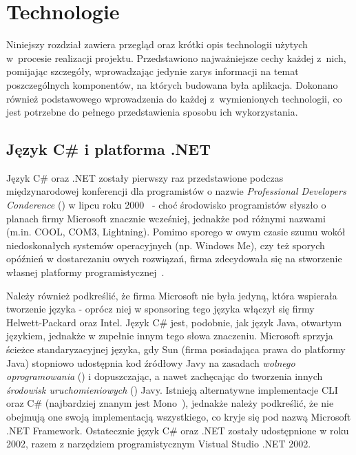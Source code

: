 \chapter{Technologie}\label{chap:technologie}

Niniejszy rozdział zawiera przegląd oraz krótki opis technologii użytych w~procesie realizacji projektu. Przedstawiono najważniejsze cechy każdej z~nich, pomijając szczegóły, wprowadzając jedynie zarys informacji na temat poszczególnych komponentów, na których budowana była aplikacja. Dokonano również podstawowego wprowadzenia do każdej z~wymienionych technologii, co jest potrzebne do pełnego przedstawienia sposobu ich wykorzystania.

\section{Język C\# i platforma .NET}\label{sec:cs}
Język C\# oraz .NET zostały pierwszy raz przedstawione podczas międzynarodowej konferencji dla programistów o nazwie \emph{Professional Developers Conderence} () w lipcu roku 2000~\cite{ms:initDotNet} - choć środowisko programistów słyszło o planach firmy Microsoft znacznie wcześniej, jednakże pod różnymi nazwami (m.in. COOL, COM3, Lightning). Pomimo sporego w owym czasie szumu wokół niedoskonałych systemów operacyjnych (np. Windows Me), czy też sporych opóźnień w dostarczaniu owych rozwiązań, firma zdecydowała się na stworzenie własnej platformy programistycznej~\cite{cSharp:inDepthF}.

Należy również podkreślić, że firma Microsoft nie była jedyną, która wspierała tworzenie języka - oprócz niej w sponsoring tego języka włączył się firmy Helwett-Packard oraz Intel. Język C\# jest, podobnie, jak język Java, otwartym językiem, jednakże w zupełnie innym tego słowa znaczeniu. Microsoft sprzyja ścieżce standaryzacyjnej języka, gdy Sun (firma posiadająca prawa do platformy Java) stopniowo udostępnia kod źródłowy Javy na zasadach \emph{wolnego oprogramowania} () i dopuszczając, a nawet zachęcając do tworzenia innych \emph{środowisk uruchomieniowych} () Javy. Istnieją alternatywne implementacje CLI oraz C\# (najbardziej znanym jest Mono~\cite{cs:mono}), jednakże należy podkreślić, że nie obejmują one swoją implementacją wszystkiego, co kryje się pod nazwą Microsoft .NET Framework. Ostatecznie język C\# oraz .NET zostały udostępnione w roku 2002, razem z narzędziem programistycznym Vistual Studio .NET 2002.

